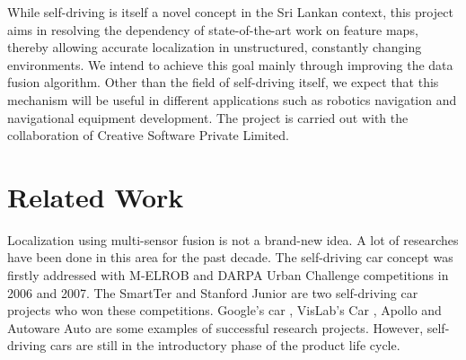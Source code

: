 While self-driving is itself a novel concept in the Sri Lankan context, this project aims in resolving the dependency of state-of-the-art work on feature maps, thereby allowing accurate localization in unstructured, constantly changing environments. We intend to achieve this goal mainly through improving the data fusion algorithm. Other than the field of self-driving itself, we expect that this mechanism will be useful in different applications such as robotics navigation and navigational equipment development. The project is carried out with the collaboration of Creative Software Private Limited.





\section{Related Work}
Localization using multi-sensor fusion is not a brand-new idea. A lot of researches have been done in this area for the past decade. The self-driving car concept was firstly addressed with \gls{M-ELROB} and \gls{DARPA} Urban Challenge competitions in 2006 and 2007\cite{pa:GIZA}. The SmartTer \cite{pa:Smartter} and Stanford Junior \cite{pa:StanfordJunior} are two self-driving car projects who won these competitions. Google’s car \cite{pa:GoogleCar}, VisLab’s Car \cite{pa:VisilabCar}, Apollo \cite{pa:Apollo} and Autoware Auto \cite{pa:AutowareAuto} are some examples of successful research projects. However, self-driving cars are still in the introductory phase of the product life cycle.

